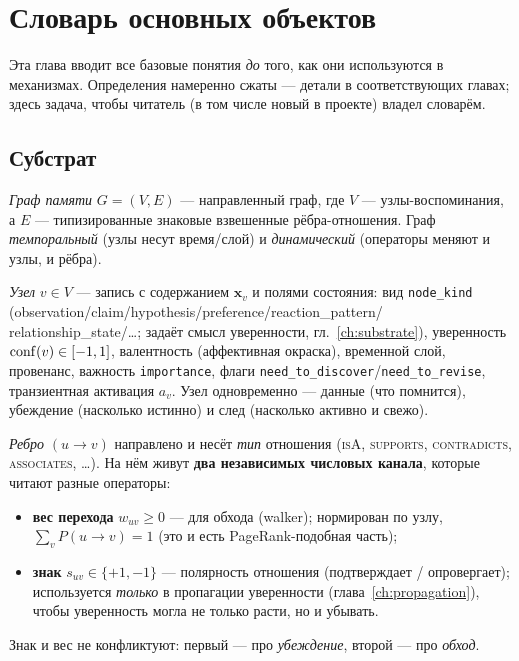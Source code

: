 \chapter{Словарь основных объектов}
\label{ch:definitions}

Эта глава вводит все базовые понятия \emph{до} того, как они используются в
механизмах. Определения намеренно сжаты — детали в соответствующих главах; здесь
задача, чтобы читатель (в том числе новый в проекте) владел словарём.

\section{Субстрат}

\begin{definition}
\emph{Граф памяти} $G=(V,E)$ — направленный граф, где $V$ — узлы-воспоминания, а
$E$ — типизированные знаковые взвешенные рёбра-отношения. Граф \emph{темпоральный}
(узлы несут время/слой) и \emph{динамический} (операторы меняют и узлы, и рёбра).
\end{definition}

\begin{definition}
\emph{Узел} $v\in V$ — запись с содержанием $\mathbf{x}_v$ и полями состояния:
вид \texttt{node\_kind} (observation/claim/hypothesis/preference/reaction\_pattern/
relationship\_state/\dots; задаёт смысл уверенности, гл.~\ref{ch:substrate}),
уверенность $\mathrm{conf}(v)\in[-1,1]$, валентность (аффективная окраска), временной слой,
провенанс, важность \texttt{importance}, флаги
\texttt{need\_to\_discover}/\texttt{need\_to\_revise}, транзиентная активация $a_v$.
Узел одновременно — данные (что помнится), убеждение (насколько истинно) и след
(насколько активно и свежо).
\end{definition}

\begin{definition}
\emph{Ребро} $(u\to v)$ направлено и несёт \emph{тип} отношения (\textsc{isA},
\textsc{supports}, \textsc{contradicts}, \textsc{associates}, \dots). На нём живут
\textbf{два независимых числовых канала}, которые читают разные операторы:
\begin{itemize}
\item \textbf{вес перехода} $w_{uv}\ge 0$ — для обхода (walker); нормирован по узлу,
$\sum_{v} P(u\to v)=1$ (это и есть PageRank-подобная часть);
\item \textbf{знак} $s_{uv}\in\{+1,-1\}$ — полярность отношения (подтверждает /
опровергает); используется \emph{только} в пропагации уверенности
(глава~\ref{ch:propagation}), чтобы уверенность могла не только расти, но и убывать.
\end{itemize}
Знак и вес не конфликтуют: первый — про \emph{убеждение}, второй — про \emph{обход}.
\end{definition}

